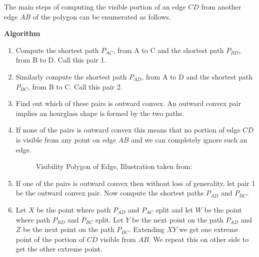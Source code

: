 \documentclass[a4paper,10pt]{article}
\begin{document}
The main steps of computing the visible portion of an edge $CD$ from another edge $AB$ of the polygon can be enumerated as follows.

{\bf Algorithm}



\begin{enumerate}
\item
Compute the shortest path $P_{AC}$, from A to C and the shortest path $P_{BD}$, from B to D. Call this pair 1.
\item
Similarly compute the shortest path  $P_{AD}$, from A to D and the shortest path  $P_{BC}$,  from B to C. Call this pair 2.
\item
Find out which of these pairs is outward convex. An outward convex pair implies an hourglass shape is formed by the two paths.
\item
If none of the pairs is outward convex this means that no portion of edge $CD$ is visible from any point on edge $AB$ and we can 
completely ignore such an edge.

\begin{figure}[h]
\begin{center}
\caption{\label{fig:Visibility Polygon of Edge}Visibility Polygon of Edge, Illustration taken from:\cite{key3}}
\end{center}
\end{figure}

\item
If one of the pairs is outward convex then without loss of generality, let pair 1 be the outward convex pair. Now compute the shortest 
paths  $P_{AD}$ and  $P_{BC}$.

\item
Let $X$ be the point where path $P_{AD}$ and $P_{AC}$ split and let  $W$ be the point where path $P_{BD}$ and $P_{BC}$ split. Let $Y$ be
the next point on the path  $P_{AD}$ and $Z$ be the next point on the path   $P_{BC}$. Extending $XY$ we get one extreme point of the 
portion of $CD$ visible from $AB$. We repeat this on other side to get the other extreme point.


\end{enumerate}
\end{document}
